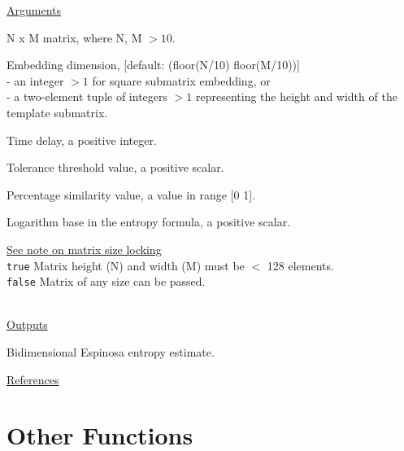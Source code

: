 \documentclass[12pt, a4paper, titlepage, openany]{book}
\begin{document}
\noindent \ul{Arguments}
\begin{description}[labelsep=1cm, labelwidth=2cm, nosep,,style=multiline,leftmargin=3cm]\footnotesize
\item[\texttt{Mat}]		N x M matrix,  where N, M $> 10$.
\item[\texttt{m}]		Embedding dimension, [default: (floor(N/10) floor(M/10))]\\
						- an integer $> 1$ for square submatrix embedding, or\\
						- a two-element tuple of integers $> 1$ representing the height and width of the template submatrix.
\item[\texttt{tau}]		Time delay, a positive integer.
\item[\texttt{r}]		Tolerance threshold value, a positive scalar.
\item[\texttt{ps}]		Percentage similarity value, a value in range [0 1].
\item[\texttt{Logx}]	Logarithm base in the entropy formula, a positive scalar.
\item[\texttt{Lock}]	\hyperlink{bidinote}{\ul{See note on matrix size locking}}\\
					\texttt{true} \hspace{15pt} Matrix height (N) and width (M) must be $<$ 128 elements.\\
					\texttt{false}\hspace{12pt} Matrix of any size can be passed.\\ \
\end{description}

\noindent \ul{Outputs}
\begin{description}[labelsep=1cm, labelwidth=2cm, nosep, style=multiline,leftmargin=3cm]\footnotesize
\item[\texttt{Esp2D}]		Bidimensional Espinosa entropy estimate.
\end{description}

\noindent \ul{References}\hspace{1cm}
\cite{Esp2D1}






\newpage
\section{Other Functions}
\vspace{1em}
\end{document}
